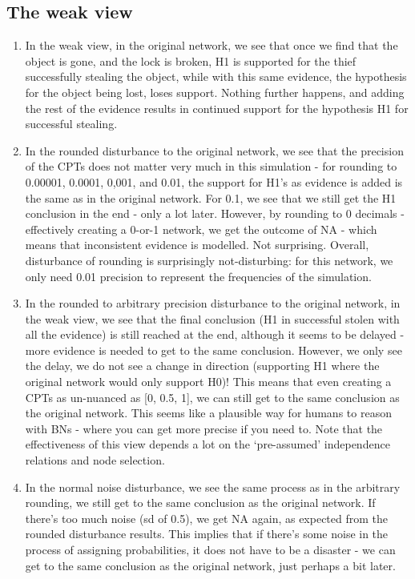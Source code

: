 \documentclass[11pt]{amsart}
\begin{document}
\subsection{The weak view}
\begin{enumerate}
\item In the weak view, in the original network, we see that once we find that the object is gone, and the lock is broken, H1 is supported for the thief successfully stealing the object, while with this same evidence, the hypothesis for the object being lost, loses support. Nothing further happens, and adding the rest of the evidence results in continued support for the hypothesis H1 for successful stealing.

\item In the rounded disturbance to the original network, we see that the precision of the CPTs does not matter very much in this simulation - for rounding to 0.00001, 0.0001, 0,001, and 0.01, the support for H1's as evidence is added is the same as in the original network. For 0.1, we see that we still get the H1 conclusion in the end - only a lot later. However, by rounding to 0 decimals - effectively creating a 0-or-1 network, we get the outcome of NA - which means that inconsistent evidence is modelled. Not surprising. Overall, disturbance of rounding is surprisingly not-disturbing: for this network, we only need 0.01 precision to represent the frequencies of the simulation.
\item In the rounded to arbitrary precision disturbance to the original network, in the weak view, we see that the final conclusion (H1 in successful stolen with all the evidence) is still reached at the end, although it seems to be delayed - more evidence is needed to get to the same conclusion. However, we only see the delay, we do not see a change in direction (supporting H1 where the original network would only support H0)! This means that even creating a CPTs as un-nuanced as [0, 0.5, 1], we can still get to the same conclusion as the original network. This seems like a plausible way for humans to reason with BNs - where you can get more precise if you need to. Note that the effectiveness of this view depends a lot on the `pre-assumed' independence relations and node selection.
\item In the normal noise disturbance, we see the same process as in the arbitrary rounding, we still get to the same conclusion as the original network. If there's too much noise (sd of 0.5), we get NA again, as expected from the rounded disturbance results. This implies that if there's some noise in the process of assigning probabilities, it does not have to be a disaster - we can get to the same conclusion as the original network, just perhaps a bit later.

\end{enumerate}
\end{document}
